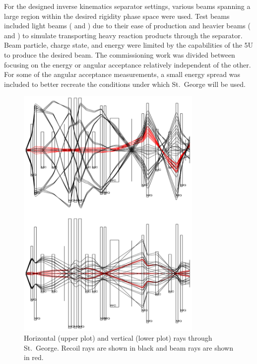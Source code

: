 For the designed inverse kinematics separator settings, various beams spanning
a large region within the desired rigidity phase space were used. Test beams
included light beams ( and ) due to their ease of
production and heavier beams ( and ) to simulate
transporting heavy reaction products through the separator. Beam particle,
charge state, and energy were limited by the capabilities of the 5U to produce
the desired beam. The commissioning
work was divided between focusing on the energy or angular acceptance
relatively independent of the other. For some of the angular acceptance
measurements, a small energy spread was included to better recreate the
conditions under which St.\ George will be used.


\begin{figure}
    \begin{center}
        \centerline{
            \includegraphics[width=0.8\textwidth]{figures/raytrace.png}}
        \caption[Horizontal and vertical rays through St.\ George]{Horizontal
            (upper plot) and vertical (lower plot) rays through St.\ George.
            Recoil  rays are shown in black and beam 
            rays are shown in red.
}
\end{center}
\end{figure}

